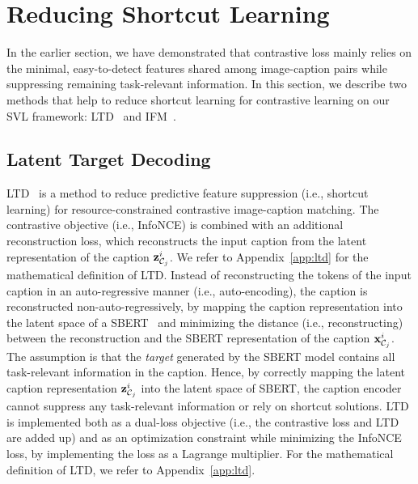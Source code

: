 
\section{Reducing Shortcut Learning}
\label{sec:reducing_shortcut_solution}

In the earlier section, we have demonstrated that contrastive loss mainly relies on the minimal, easy-to-detect features shared among image-caption pairs while suppressing remaining task-relevant information.
In this section, we describe two methods that help to reduce shortcut learning for contrastive learning on our \ac{SVL} framework: \Acl{LTD}~\citep{bleeker2023reducing} and  \acl{IFM}~\citep{robinson2021can}. 

\subsection{Latent Target Decoding}  

\Acf{LTD}~\citep{bleeker2023reducing} is a method to reduce predictive feature suppression (i.e., shortcut learning) for resource-constrained contrastive image-caption matching. 
The contrastive objective (i.e., InfoNCE)  is combined with an additional reconstruction loss, which reconstructs the input caption from the latent representation of the caption $\zcapt{i}{j}$. 
We refer to Appendix~\ref{app:ltd} for the mathematical definition of \ac{LTD}.
Instead of reconstructing the tokens of the input caption in an auto-regressive manner (i.e., auto-encoding), the caption is reconstructed non-auto-regressively, by mapping the caption representation into the latent space of a \acl{SBERT}~\citep{reimersers2019sentence, song2020mpnet} and minimizing the distance (i.e., reconstructing) between the reconstruction and the \acl{SBERT} representation of the caption $\capt{i}{j}$. 
The assumption is that the \emph{target} generated by the \acl{SBERT} model contains all task-relevant information in the caption. 
Hence, by correctly mapping the latent caption representation $\zcapt{i}{j}$ into the latent space of \acl{SBERT}, the caption encoder cannot suppress any task-relevant information or rely on shortcut solutions. 
\ac{LTD} is implemented both as a dual-loss objective (i.e., the contrastive loss and \ac{LTD} are added up) and as an optimization constraint while minimizing the InfoNCE loss, by implementing the loss as a Lagrange multiplier. For the mathematical definition of \ac{LTD}, we refer to Appendix~\ref{app:ltd}.

